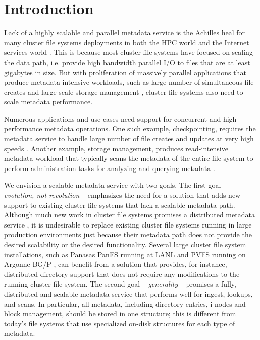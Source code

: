 \section{Introduction}

Lack of a highly scalable and parallel metadata service is the 
Achilles heal for many cluster file systems deployments in both the HPC world 
and the Internet services world \citep{hecfsio:tr06, hpcs-io:2008}.
This is because most cluster file systems have focused on scaling the
data path, i.e. provide high bandwidth parallel I/O to files that are 
at least gigabytes in size.
But with proliferation of massively parallel applications that produce 
metadata-intensive workloads, such as large number of simultaneous file creates
\cite{PLFS} and large-scale storage management \cite{issdm}, cluster file systems 
also need to scale metadata performance.

Numerous applications and use-cases need support for concurrent and 
high-performance metadata operations.
One such example, checkpointing, requires the metadata service to
handle large number of file creates and updates at very high speeds 
\cite{PLFS}.
Another example, storage management, produces read-intensive metadata workload
that typically scans the metadata of the entire file system to perform
administration tasks for analyzing and querying metadata \cite{issdm}.

We envision a scalable metadata service with two goals. 
The first goal -- \textit{evolution, not revolution} -- emphasizes the need for
a solution that adds new support to existing cluster file systems that lack a 
scalable metadata path.
Although much new work in cluster file systems promises a distributed
metadata service \cite{ceph:weil06, 50mfiles-in-googlefs:fikes10}, it is
undesirable to replace existing cluster file systems running in large production
environments just because their metadata path does not provide the desired
scalability or the desired functionality.
Several large cluster file system installations, such as Panasas PanFS running
at LANL \cite{cielo} and PVFS running on Argonne BG/P 
\cite{pvfs:www,bgp}, can 
benefit from a solution that provides, for instance, distributed directory support 
that does not require any modifications to the running cluster file system.
The second goal -- \textit{generality} -- promises a fully, distributed and
scalable metadata service that performs well for ingest, lookups, and scans.
In particular, all metadata, including directory entries, i-nodes and block
management, should be stored in one structure; this is different from
today's file systems that use specialized on-disk structures for each type of 
metadata.

